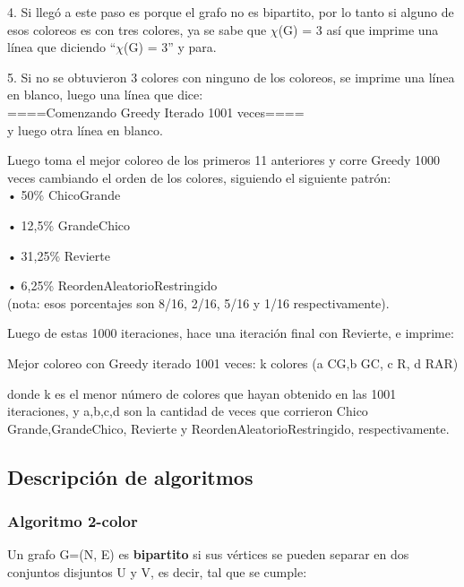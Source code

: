 \documentclass[11pt,a4paper]{article}
\theoremstyle{plain}
\begin{document}
4. Si llegó a este paso es porque el grafo no es bipartito, por lo tanto si alguno de esos coloreos es con tres colores, ya se sabe que $\chi$(G) = 3 así que imprime una línea que diciendo “$\chi$(G) = 3” y para.

5. Si no se obtuvieron 3 colores con ninguno de los coloreos, se imprime una línea en blanco, luego una línea que dice:\\

====Comenzando Greedy Iterado 1001 veces====\\

y luego otra línea en blanco.

Luego toma el mejor coloreo de los primeros 11 anteriores y corre Greedy 1000 veces cambiando el orden de los colores, siguiendo el siguiente patrón:\\

• 50\% ChicoGrande

• 12,5\% GrandeChico

• 31,25\% Revierte

• 6,25\% ReordenAleatorioRestringido\\

(nota: esos porcentajes son 8/16, 2/16, 5/16 y 1/16 respectivamente).

Luego de estas 1000 iteraciones, hace una iteración final con Revierte, e imprime:

Mejor coloreo con Greedy iterado 1001 veces: k colores
(a CG,b GC, c R, d RAR)

donde k es el menor número de colores que hayan obtenido en las 1001 iteraciones, y a,b,c,d son la cantidad de veces que corrieron Chico Grande,GrandeChico, Revierte y ReordenAleatorioRestringido,
respectivamente.

		\subsection{Descripción de algoritmos}

\subsubsection{Algoritmo 2-color}


Un grafo G=(N, E) es \textbf{bipartito} si sus vértices se pueden separar en dos conjuntos disjuntos U y V, es decir, tal que se cumple:
\end{document}
